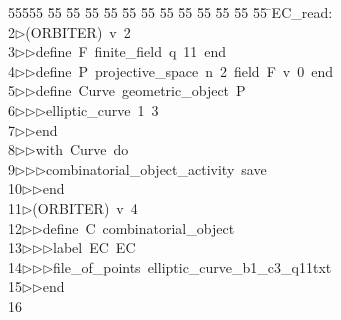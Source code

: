 %
%
\begin{tabbing}
55555 \= 55 \= 55 \= 55 \= 55 \= 55 \= 55 \= 55 \= 55 \= 55 \= 55 \= 55 \= 55 \= \>EC\_read:\ \\[0pt]
2\>$\triangleright$\>(ORBITER)\ v\ 2\ \\[0pt]
3\>$\triangleright$\>$\triangleright$\>define\ F\ finite\_field\ q\ 11\ end\ \\[0pt]
4\>$\triangleright$\>$\triangleright$\>define\ P\ projective\_space\ n\ 2\ field\ F\ v\ 0\ end\ \\[0pt]
5\>$\triangleright$\>$\triangleright$\>define\ Curve\ geometric\_object\ P\ \\[0pt]
6\>$\triangleright$\>$\triangleright$\>$\triangleright$\>elliptic\_curve\ 1\ 3\ \\[0pt]
7\>$\triangleright$\>$\triangleright$\>end\ \\[0pt]
8\>$\triangleright$\>$\triangleright$\>with\ Curve\ do\ \\[0pt]
9\>$\triangleright$\>$\triangleright$\>$\triangleright$\>combinatorial\_object\_activity\ save\ \\[0pt]
10\>$\triangleright$\>$\triangleright$\>end\\[0pt]
11\>$\triangleright$\>(ORBITER)\ v\ 4\ \\[0pt]
12\>$\triangleright$\>$\triangleright$\>define\ C\ combinatorial\_object\ \\[0pt]
13\>$\triangleright$\>$\triangleright$\>$\triangleright$\>label\ EC\ EC\ \\[0pt]
14\>$\triangleright$\>$\triangleright$\>$\triangleright$\>file\_of\_points\ elliptic\_curve\_b1\_c3\_q11txt\ \\[0pt]
15\>$\triangleright$\>$\triangleright$\>end\\[0pt]
16\>\end{tabbing}

